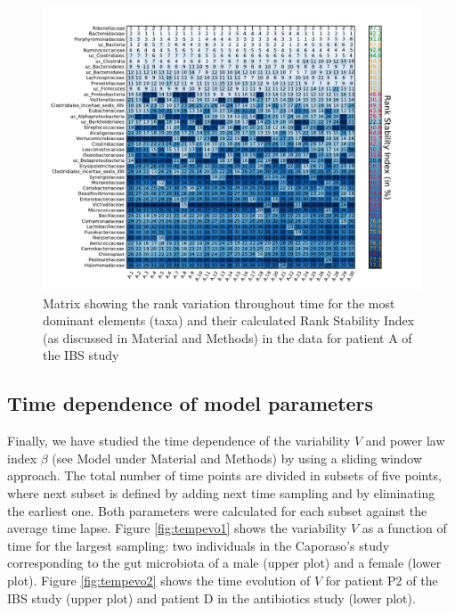 \begin{figure}
	\centering
	\includegraphics[width=\textwidth]{results/corrank/IBS_h_A_amplicons_family_Rank.pdf}
	\caption{Matrix showing the rank variation throughout time for the most dominant elements (taxa) and their calculated Rank Stability Index (as discussed in Material and Methods) in the data  for patient A of the IBS study\cite{IBS}}
	\label{fig:corrank}
\end{figure}


\subsection*{Time dependence of model parameters}

Finally, we have studied the time dependence of the variability $V$ and power law index $\beta$ (see Model under Material and Methods) by using a sliding window approach. The total number of time points are divided in subsets of five points, where next subset is defined by adding next time sampling and by eliminating the earliest one. Both parameters were calculated for each subset against the average time lapse. Figure \ref{fig:tempevo1} shows the variability  $V$ as a function of time for the largest sampling: two individuals in the Caporaso's study\cite{moving} corresponding to the gut microbiota of a male (upper plot) and a female (lower plot). Figure \ref{fig:tempevo2} shows the time evolution of $V$ for patient P2 of the IBS study\cite{IBS} (upper plot) and patient D in the antibiotics study\cite{antibiotic} (lower plot). 

